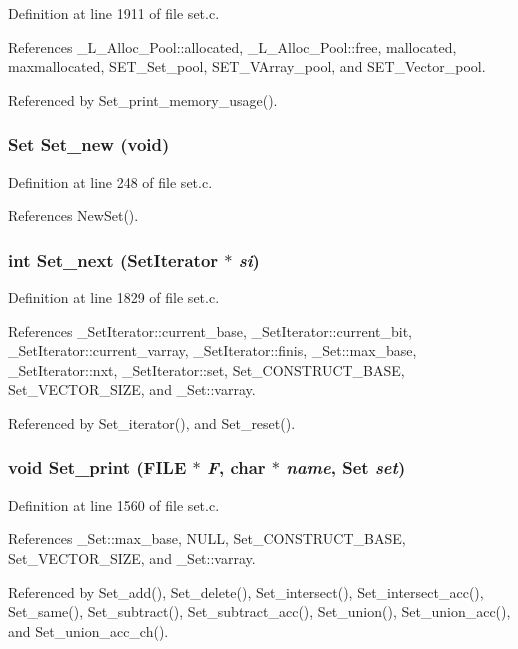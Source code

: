 Definition at line 1911 of file set.c.

References \_\-L\_\-Alloc\_\-Pool::allocated, \_\-L\_\-Alloc\_\-Pool::free, mallocated, maxmallocated, SET\_\-Set\_\-pool, SET\_\-VArray\_\-pool, and SET\_\-Vector\_\-pool.

Referenced by Set\_\-print\_\-memory\_\-usage().
\subsubsection{\setlength{\rightskip}{0pt plus 5cm}\bf{Set} Set\_\-new (void)}\label{set_8c_e41d4e9316cf48def43503b5b653a343}




Definition at line 248 of file set.c.

References New\-Set().
\subsubsection{\setlength{\rightskip}{0pt plus 5cm}int Set\_\-next (\bf{Set\-Iterator} $\ast$ {\em si})}\label{set_8c_8927f07a262987755e10ac33bd385cec}




Definition at line 1829 of file set.c.

References \_\-Set\-Iterator::current\_\-base, \_\-Set\-Iterator::current\_\-bit, \_\-Set\-Iterator::current\_\-varray, \_\-Set\-Iterator::finis, \_\-Set::max\_\-base, \_\-Set\-Iterator::nxt, \_\-Set\-Iterator::set, Set\_\-CONSTRUCT\_\-BASE, Set\_\-VECTOR\_\-SIZE, and \_\-Set::varray.

Referenced by Set\_\-iterator(), and Set\_\-reset().
\subsubsection{\setlength{\rightskip}{0pt plus 5cm}void Set\_\-print (FILE $\ast$ {\em F}, char $\ast$ {\em name}, \bf{Set} {\em set})}\label{set_8c_817e6a8e257b5d168a6e7689a0a2a5d1}




Definition at line 1560 of file set.c.

References \_\-Set::max\_\-base, NULL, Set\_\-CONSTRUCT\_\-BASE, Set\_\-VECTOR\_\-SIZE, and \_\-Set::varray.

Referenced by Set\_\-add(), Set\_\-delete(), Set\_\-intersect(), Set\_\-intersect\_\-acc(), Set\_\-same(), Set\_\-subtract(), Set\_\-subtract\_\-acc(), Set\_\-union(), Set\_\-union\_\-acc(), and Set\_\-union\_\-acc\_\-ch().
